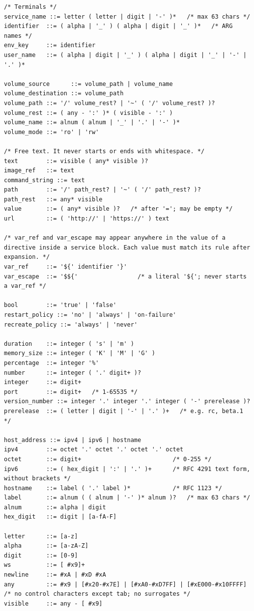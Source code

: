 \documentclass[a4paper,11pt]{article}
\begin{document}
\begin{lstlisting}
/* Terminals */
service_name ::= letter ( letter | digit | '-' )*   /* max 63 chars */
identifier  ::= ( alpha | '_' ) ( alpha | digit | '_' )*   /* ARG names */
env_key     ::= identifier
user_name   ::= ( alpha | digit | '_' ) ( alpha | digit | '_' | '-' | '.' )*

volume_source      ::= volume_path | volume_name
volume_destination ::= volume_path
volume_path ::= '/' volume_rest? | '~' ( '/' volume_rest? )?
volume_rest ::= ( any - ':' )* ( visible - ':' )
volume_name ::= alnum ( alnum | '_' | '.' | '-' )*
volume_mode ::= 'ro' | 'rw'

/* Free text. It never starts or ends with whitespace. */
text        ::= visible ( any* visible )?
image_ref   ::= text
command_string ::= text
path        ::= '/' path_rest? | '~' ( '/' path_rest? )?
path_rest   ::= any* visible
value       ::= ( any* visible )?   /* after '='; may be empty */
url         ::= ( 'http://' | 'https://' ) text

/* var_ref and var_escape may appear anywhere in the value of a directive inside a service block. Each value must match its rule after expansion. */
var_ref     ::= '${' identifier '}'
var_escape  ::= '$${'                 /* a literal '${'; never starts a var_ref */

bool        ::= 'true' | 'false'
restart_policy ::= 'no' | 'always' | 'on-failure'
recreate_policy ::= 'always' | 'never'

duration    ::= integer ( 's' | 'm' )
memory_size ::= integer ( 'K' | 'M' | 'G' )
percentage  ::= integer '%'
number      ::= integer ( '.' digit+ )?
integer     ::= digit+
port        ::= digit+   /* 1-65535 */
version_number ::= integer '.' integer '.' integer ( '-' prerelease )?
prerelease  ::= ( letter | digit | '-' | '.' )+   /* e.g. rc, beta.1 */

host_address ::= ipv4 | ipv6 | hostname
ipv4        ::= octet '.' octet '.' octet '.' octet
octet       ::= digit+                          /* 0-255 */
ipv6        ::= ( hex_digit | ':' | '.' )+      /* RFC 4291 text form, without brackets */
hostname    ::= label ( '.' label )*            /* RFC 1123 */
label       ::= alnum ( ( alnum | '-' )* alnum )?   /* max 63 chars */
alnum       ::= alpha | digit
hex_digit   ::= digit | [a-fA-F]

letter      ::= [a-z]
alpha       ::= [a-zA-Z]
digit       ::= [0-9]
ws          ::= [ #x9]+
newline     ::= #xA | #xD #xA
any         ::= #x9 | [#x20-#x7E] | [#xA0-#xD7FF] | [#xE000-#x10FFFF]   /* no control characters except tab; no surrogates */
visible     ::= any - [ #x9]
\end{lstlisting}
\end{document}
